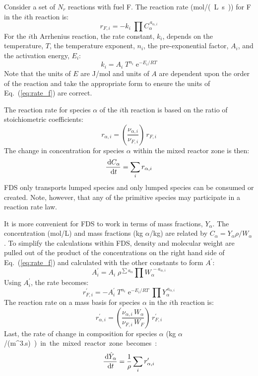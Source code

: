 Consider a set of $N_r$ reactions with fuel F. The reaction rate (\si{mol/(L.s)}) for F in the $i$th reaction is:
\begin{equation}\label{eq:rate_f}
r_{\si{F},i}= -k_{i}\; \prod C_{\alpha}^{\,a_{\alpha,i}}
\end{equation}
For the $i$th Arrhenius reaction, the rate constant, $k_i$, depends on the temperature, $T$, the temperature exponent, $n_i$, the pre-exponential factor, $A_i$, and the activation energy, $E_i$:
\begin{equation}\label{eq:rate_cons}
k_i = A_i\;T^{n_i}\;\mathrm{e}^{-E_i/RT}
\end{equation}
Note that the units of $E$ are J/mol and units of $A$ are dependent upon the order of the reaction and take the appropriate form to ensure the units of Eq.~(\ref{eq:rate_f}) are correct.

The reaction rate for species $\alpha$ of the $i$th reaction is based on the ratio of stoichiometric coefficients:
\begin{equation}\label{eq:rate_a}
r_{\alpha,i}= \left(\frac{\nu_{\alpha,i}}{\nu_{F,i}}\right)\,r_{\si{F},i}
\end{equation}
The change in concentration for species $\alpha$ within the mixed reactor zone is then:
\begin{equation}\label{rate_expression}
\frac{\,\mathrm{d} C_{\alpha}}{\,\mathrm{d} t} = \sum_{i} r_{\alpha,i}
\end{equation}
FDS only transports lumped species and only lumped species can be consumed or created.  Note, however, that any of the primitive species may participate in a reaction rate law.

It is more convenient for FDS to work in terms of mass fractions, $Y_{\alpha}$.  The concentration (mol/L) and mass fractions (kg $\alpha$/kg) are related by $C_{\alpha}=Y_{\alpha} \rho/W_{\alpha}$.
To simplify the calculations within FDS, density and molecular weight are pulled out of the product of the concentrations on the right hand side of Eq.~(\ref{eq:rate_f}) and calculated with the other constants to form $A^{\prime}$:
\begin{equation}\label{eq:aprime}
A^{\prime}_{i} = A_{i}\;\rho^{\sum a_{\alpha}}\prod W_{\alpha}^{\,-a_{\alpha,i}}
\end{equation}
Using $A_i^{\prime}$, the rate becomes:
\begin{equation}\label{eq:finite_rate_fin}
r^{\prime}_{F,i} = -A_i^{\prime}\;T^{n_i}\;\mathrm{e}^{-E_i/RT}\;\prod Y_{\alpha}^{\,a_{\alpha,i}}
\end{equation}
The reaction rate on a mass basis for species $\alpha$ in the $i$th reaction is:
\begin{equation}\label{eq:rate_a_y}
r^{\prime}_{\alpha,i}= \left(\frac{\nu_{\alpha,i}\,W_{\alpha}}{\nu_{F,i}\,W_{F}}\right)\,r^{\prime}_{F,i}
\end{equation}
Last, the rate of change in composition for species $\alpha$ (\si{kg $\alpha$/(m^3.s)}) in the mixed reactor zone becomes:
\begin{equation}\label{rate_expression_y}
\frac{\,\mathrm{d} \hat{Y}_{\alpha}}{\,\mathrm{d} t} = \frac{1}{\rho}\sum_{i} r^{\prime}_{\alpha,i}
\end{equation}



